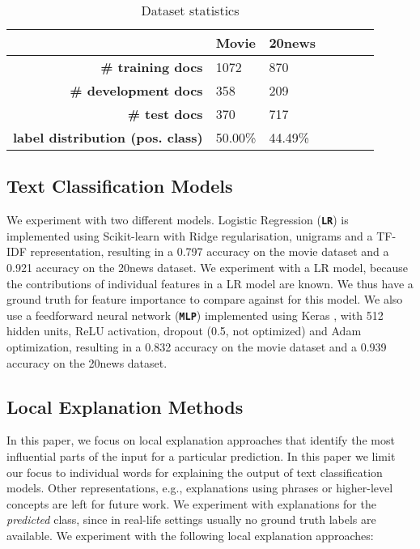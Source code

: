 \documentclass[11pt,a4paper]{article}
\begin{document}
\begin{table}[h!]
\small
\center
\begin{tabular}{rllllll}
\toprule
& \textbf{Movie} &\textbf{20news} \\
\midrule
\textbf{\# training docs} & 1072 & 870\\
 \textbf{\#  development docs} &358 & 209\\
 \textbf{\# test docs} &370 & 717 \\
 \textbf{label distribution (pos. class)} & 50.00\%& 44.49\%\\
\bottomrule
\end{tabular}
\caption{Dataset statistics}
\label{dataset_stats}
\end{table}



\subsection{Text Classification Models}
We experiment with two different models. Logistic Regression (\textbf{\texttt{LR}}) is implemented using
Scikit-learn \cite{scikit-learn} with Ridge regularisation, unigrams and a TF-IDF representation, resulting in a 0.797 accuracy on the movie dataset  and a 0.921 accuracy on the 20news dataset. We experiment with a LR model, because the contributions of individual features in a LR model are known. We thus have a ground truth for feature importance to compare against for this model.
We also use a feedforward neural network (\textbf{\texttt{MLP}}) implemented using Keras \cite{chollet2015keras}, with 512 hidden units, ReLU activation, dropout (0.5, not optimized) and Adam optimization, resulting in a 0.832 accuracy on the movie dataset and a 0.939 accuracy on the 20news dataset.


\subsection{Local Explanation Methods}
In this paper, we focus on local explanation approaches that identify the most influential parts of the input for a particular prediction. 
 In this paper we limit our focus to individual words for explaining the output of text classification models. Other representations, e.g., explanations using phrases or higher-level concepts are left for future work.  
We experiment with explanations for the \emph{predicted} class, since in  real-life settings usually no ground truth labels are available.
\noindent We experiment with the following local explanation approaches:
\end{document}
